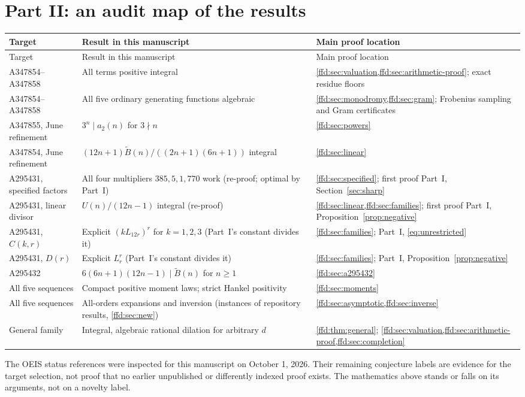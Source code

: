 \documentclass[11pt]{article}
\theoremstyle{definition}
\theoremstyle{remark}
\newcommand{\tB}{\widetilde B}
\begin{document}
\section{Part II: an audit map of the results}\label{ffd:app:audit}
\small
\renewcommand{\arraystretch}{1.25}
\begin{longtable}{p{}p{}p{}}
\toprule
Target & Result in this manuscript & Main proof location\\
\midrule
\endfirsthead
\toprule
Target & Result in this manuscript & Main proof location\\
\midrule
\endhead
A347854--A347858 & All terms positive integral & \cref{ffd:sec:valuation,ffd:sec:arithmetic-proof}; exact residue floors\\
A347854--A347858 & All five ordinary generating functions algebraic & \cref{ffd:sec:monodromy,ffd:sec:gram}; Frobenius sampling and Gram certificates\\
A347855, June refinement & $3^n\mid a_2(n)$ for $3\nmid n$ & \cref{ffd:sec:powers}\\
A347854, June refinement & $(12n+1)\tB(n)/((2n+1)(6n+1))$ integral & \cref{ffd:sec:linear}\\
A295431, specified factors & All four multipliers $385,5,1,770$ work (re-proof; optimal by Part~I) & \cref{ffd:sec:specified}; first proof Part~I, Section~\ref{sec:sharp}\\
A295431, linear divisor & $U(n)/(12n-1)$ integral (re-proof) & \cref{ffd:sec:linear,ffd:sec:families}; first proof Part~I, Proposition~\ref{prop:negative}\\
A295431, $C(k,r)$ & Explicit $(kL_{12r})^r$ for $k=1,2,3$ (Part~I's constant divides it) & \cref{ffd:sec:families}; Part~I, \eqref{eq:unrestricted}\\
A295431, $D(r)$ & Explicit $L_r^r$ (Part~I's constant divides it) & \cref{ffd:sec:families}; Part~I, Proposition~\ref{prop:negative}\\
A295432 & $6(6n+1)(12n-1)\mid \tB(n)$ for $n\ge1$ & \cref{ffd:sec:a295432}\\
All five sequences & Compact positive moment laws; strict Hankel positivity & \cref{ffd:sec:moments}\\
All five sequences & All-orders expansions and inversion (instances of repository results, \cref{ffd:sec:new}) & \cref{ffd:sec:asymptotic,ffd:sec:inverse}\\
General family & Integral, algebraic rational dilation for arbitrary $d$ & \cref{ffd:thm:general}; \cref{ffd:sec:valuation,ffd:sec:arithmetic-proof,ffd:sec:completion}\\
\bottomrule
\end{longtable}
\normalsize
The OEIS status references were inspected for this manuscript on October 1,
2026. Their remaining conjecture labels are evidence for the target selection,
not proof that no earlier unpublished or differently indexed proof exists.
The mathematics above stands or falls on its arguments, not on a novelty label.
\end{document}
